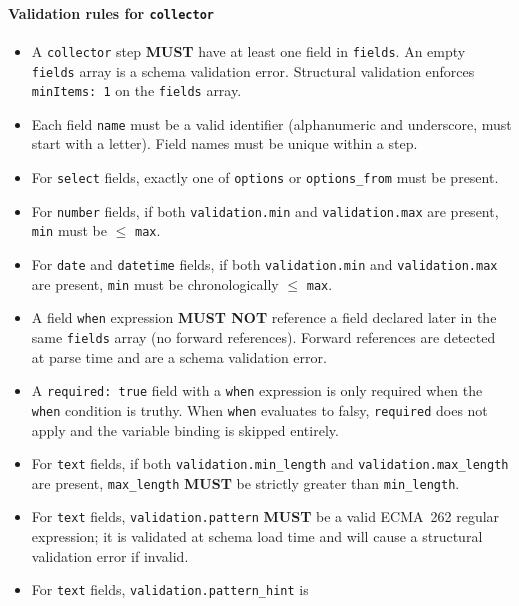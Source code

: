 \paragraph{Validation rules for \texttt{collector}}

\begin{itemize}
  \item A \texttt{collector} step \textbf{MUST} have at least one field in
        \texttt{fields}.  An empty \texttt{fields} array is a schema validation
        error.  Structural validation enforces \texttt{minItems: 1} on the
        \texttt{fields} array.
  \item Each field \texttt{name} must be a valid identifier (alphanumeric and
        underscore, must start with a letter).  Field names must be unique
        within a step.
  \item For \texttt{select} fields, exactly one of \texttt{options} or
        \texttt{options\_from} must be present.
  \item For \texttt{number} fields, if both \texttt{validation.min} and
        \texttt{validation.max} are present, \texttt{min} must be
        $\leq$ \texttt{max}.
  \item For \texttt{date} and \texttt{datetime} fields, if both
        \texttt{validation.min} and \texttt{validation.max} are present,
        \texttt{min} must be chronologically $\leq$ \texttt{max}.
  \item A field \texttt{when} expression \textbf{MUST NOT} reference a field
        declared later in the same \texttt{fields} array (no forward references).
        Forward references are detected at parse time and are a schema
        validation error.
  \item A \texttt{required: true} field with a \texttt{when} expression is
        only required when the \texttt{when} condition is truthy.  When
        \texttt{when} evaluates to falsy, \texttt{required} does not apply and
        the variable binding is skipped entirely.
  \item For \texttt{text} fields, if both \texttt{validation.min\_length} and
        \texttt{validation.max\_length} are present, \texttt{max\_length}
        \textbf{MUST} be strictly greater than \texttt{min\_length}.
  \item For \texttt{text} fields, \texttt{validation.pattern} \textbf{MUST}
        be a valid ECMA~262 regular expression; it is validated at schema
        load time and will cause a structural validation error if invalid.
  \item For \texttt{text} fields, \texttt{validation.pattern\_hint} is

\end{itemize}
